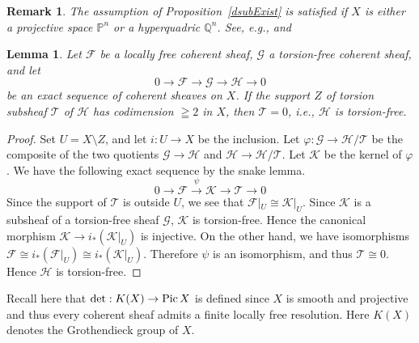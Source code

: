 \documentclass[a4paper,12pt]{amsart}
\newtheorem{lemma}[thm]{Lemma}%
\newtheorem{rmk}[thm]{Remark}%
\newcommand{\Pic}{\mathop{\rm Pic}\nolimits}
\begin{document}
\begin{rmk}
The assumption of Proposition~\ref{dsubExist}
is satisfied if $X$ is either a projective space $\mathbb{P}^n$ or a hyperquadric $\mathbb{Q}^n$.
See, e.g., \cite[Chap. 1 Theorem 3.2.1]{oss} and \cite[Lemma 3.6.1]{w3}
\end{rmk}

\begin{lemma}\label{quotientTorsionFree}
Let $\mathcal{F}$ be a locally free coherent sheaf,
$\mathcal{G}$ a torsion-free coherent sheaf,
and let 
\[0\to \mathcal{F}\to \mathcal{G}\to \mathcal{H}\to 0\]
be an exact sequence of coherent sheaves on $X$.
If the support $Z$ of torsion subsheaf $\mathcal{T}$ of $\mathcal{H}$ has codimension $\geqq 2$ in $X$,
then $\mathcal{T}=0$, i.e., $\mathcal{H}$ is torsion-free.
\end{lemma}
\begin{proof}
Set $U=X\setminus Z$, and let $i:U\to X$ be the inclusion.
Let 
$\varphi:\mathcal{G}\to \mathcal{H}/\mathcal{T}$ be the composite of the two quotients
$\mathcal{G}\to \mathcal{H}$ and $\mathcal{H}\to \mathcal{H}/\mathcal{T}$.
Let $\mathcal{K}$ be the kernel of $\varphi$. We have the following exact sequence by 
the snake lemma.
\[0\to \mathcal{F}\xrightarrow{\psi} \mathcal{K}\to \mathcal{T}\to 0\]
Since the support of $\mathcal{T}$ is outside $U$,
we see that $\mathcal{F}|_U\cong \mathcal{K}|_U$. 
Since $\mathcal{K}$ is a subsheaf of a torsion-free sheaf $\mathcal{G}$,
$\mathcal{K}$ is torsion-free. Hence the canonical morphism $\mathcal{K}\to i_*(\mathcal{K}|_U)$ is injective.
On the other hand, we have isomorphisms $\mathcal{F}\cong i_*(\mathcal{F}|_U)\cong i_*(\mathcal{K}|_U)$.
Therefore $\psi$ is an isomorphism, and thus $\mathcal{T}\cong 0$. Hence $\mathcal{H}$ is torsion-free.
\end{proof}

Recall here that $\det:K(X)\to \Pic X$ is 
defined since $X$ is smooth and projective
and thus every coherent sheaf admits a finite locally free resolution.
Here $K(X)$ denotes the Grothendieck group of $X$.
\end{document}

